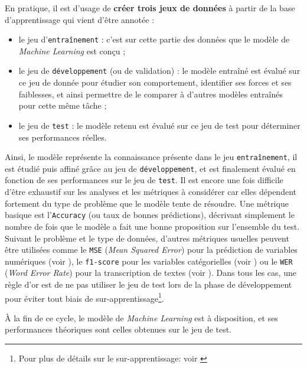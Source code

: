 			En pratique, il est d'usage de \textbf{créer trois jeux de données} à partir de la base d'apprentissage qui vient d'être annotée :
			\begin{itemize}
				\item le jeu d'\texttt{entraînement} :
				c'est sur cette partie des données que le modèle de \textit{Machine Learning} est conçu ;
				\item le jeu de \texttt{développement} (ou de validation) :
				le modèle entraîné est évalué sur ce jeu de donnée pour étudier son comportement, identifier ses forces et ses faiblesses, et ainsi permettre de le comparer à d'autres modèles entraînés pour cette même tâche ;
				\item le jeu de \texttt{test} :
				le modèle retenu est évalué sur ce jeu de test pour déterminer ses performances réelles.
			\end{itemize}
			
			Ainsi, le modèle représente la connaissance présente dans le jeu \texttt{entraînement}, il est étudié puis affiné grâce au jeu de \texttt{développement}, et est finalement évalué en fonction de ses performances sur le jeu de \texttt{test}.
			Il est encore une fois difficile d'être exhaustif sur les analyses et les métriques à considérer car elles dépendent fortement du type de problème que le modèle tente de résoudre.
			Une métrique basique est l'\texttt{Accuracy} (ou taux de bonnes prédictions), décrivant simplement le nombre de fois que le modèle a fait une bonne proposition sur l'ensemble du test.
			Suivant le problème et le type de données, d'autres métriques usuelles peuvent être utilisées comme le \texttt{MSE} (\textit{Mean Squared Error}) pour la prédiction de variables numériques (voir \cite{wallach-goffinet:1987:mean-squared-error}), le \texttt{f1-score} pour les variables catégorielles (voir \cite{sasaki:2007:truth-fmeasure}) ou le \texttt{WER} (\textit{Word Error Rate}) pour la transcription de textes (voir \cite{mccowan-etal:2005:use-information-retrieval}).
			Dans tous les cas, une règle d'or est de ne pas utiliser le jeu de test lors de la phase de développement pour éviter tout biais de sur-apprentissage\footnote{
				Pour plus de détails sur le sur-apprentissage: voir \cite{collins:2017:chapter-overfitting}
			}.

			À la fin de ce cycle, le modèle de \textit{Machine Learning} est à disposition, et ses performances théoriques sont celles obtenues sur le jeu de test.
		
